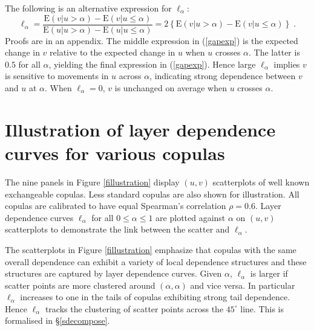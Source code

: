 \documentclass[authoryear]{elsarticle}
\newcommand{\cov}{{\rm cov}}
\newcommand{\E}{{\mathrm E}}
\newcommand{\cor}{\mathrm{cor}}
\newcommand{\cq}{\ ,\quad }
\newcommand{\eref}[1]{(\ref{#1})}
\newcommand{\fref}[1]{Figure \ref{#1}}
\newcommand{\sref}[1]{\S\ref{#1}}
\begin{document}
The following is an alternative expression for $\ell_\alpha$:
\begin{equation}\label{gapexp}
\ell_\alpha = \frac{\E(v|u>\alpha)-\E(v|u\leq \alpha)}{\E(u|u>\alpha)-\E(u|u\leq \alpha)}
=2 \left\{\E(v|u>\alpha)-\E(v|u\leq \alpha)\right\}\;.
\end{equation}
Proofs are in an appendix. The middle expression in \eref{gapexp} is the expected change in $v$ relative to the expected change in $u$ when $u$ crosses $\alpha$. The latter is $0.5$ for all $\alpha$, yielding the final expression in \eref{gapexp}. Hence large $\ell_\alpha$ implies $v$ is sensitive to movements in $u$ across $\alpha$, indicating strong dependence between $v$ and $u$ at $\alpha$. When $\ell_\alpha=0$, $v$ is unchanged on average when $u$ crosses $\alpha$.

\section{Illustration of layer dependence curves for various copulas}\label{sldcurve}

The nine panels in \fref{fillustration} display $(u,v)$ scatterplots of well known exchangeable copulas. Less standard copulas are also shown for illustration. All copulas are calibrated to have equal Spearman's correlation $\rho=0.6$. Layer dependence curves $\ell_\alpha$ for all $0\le\alpha\le 1$ are plotted against $\alpha$ on $(u,v)$ scatterplots to demonstrate the link between the scatter and $\ell_\alpha$.

The scatterplots in \fref{fillustration}  emphasize that copulas with the same overall dependence can exhibit a variety of local dependence structures and these structures are captured by layer dependence curves. Given $\alpha$, $\ell_\alpha$ is larger if scatter points are more clustered around $(\alpha,\alpha)$ and vice versa. In particular $\ell_\alpha$ increases to one in the tails of copulas exhibiting strong tail dependence. Hence $\ell_\alpha$ tracks the clustering of scatter points across the $45^\circ$ line. This  is formalised in \sref{sdecompose}.
\end{document}
